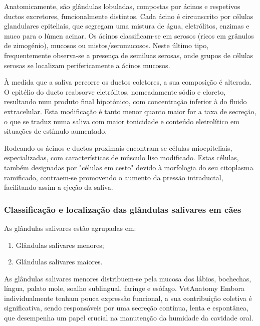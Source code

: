 Anatomicamente, são glândulas lobuladas, compostas por ácinos e respetivos ductos excretores, funcionalmente distintos. Cada ácino é circunscrito por células glandulares epiteliais, que segregam uma mistura de água, eletrólitos, enzimas e muco para o lúmen acinar. \cite{Proctor2007,cunningham} Os ácinos classificam-se em serosos (ricos em grânulos de zimogénio), mucosos ou mistos/seromucosos.\cite{cunningham} Neste último tipo, frequentemente observa-se a presença de semiluas serosas, onde grupos de células serosas se localizam perifericamente a ácinos mucosos.\cite{TextbookPhysio,cunningham} 

À medida que a saliva percorre os ductos coletores, a sua composição é alterada. \cite{Proctor2007,cunningham} O epitélio do ducto reabsorve eletrólitos, nomeadamente sódio e cloreto, resultando num produto final hipotónico, com concentração inferior à do fluido extracelular. Esta modificação é tanto menor quanto maior for a taxa de secreção, o que se traduz numa saliva com maior tonicidade e conteúdo eletrolítico em situações de estímulo aumentado. \cite{cunningham} 

Rodeando os ácinos e ductos proximais encontram-se células mioepiteliais, especializadas, com características de músculo liso modificado.\cite{cunningham} Estas células, também designadas por "células em cesto" devido à morfologia do seu citoplasma ramificado, contraem-se promovendo o aumento da pressão intraductal, facilitando assim a ejeção da saliva. \cite{TextbookPhysio,cunningham}

\subsubsection{Classificação e localização das glândulas salivares em cães}

As glândulas salivares estão agrupadas em:
\begin{enumerate}
    \item	Glândulas salivares menores;
    \item Glândulas salivares maiores.
\end{enumerate}

As glândulas salivares menores distribuem-se pela mucosa dos lábios, bochechas, língua, palato mole, soalho sublingual, faringe e esófago. \cite{dyce}VetAnatomy Embora individualmente tenham pouca expressão funcional, a sua contribuição coletiva é significativa,\cite{dyce} sendo responsáveis por uma secreção contínua, lenta e espontânea, que desempenha um papel crucial na manutenção da humidade da cavidade oral. \cite{Cappai2021}

